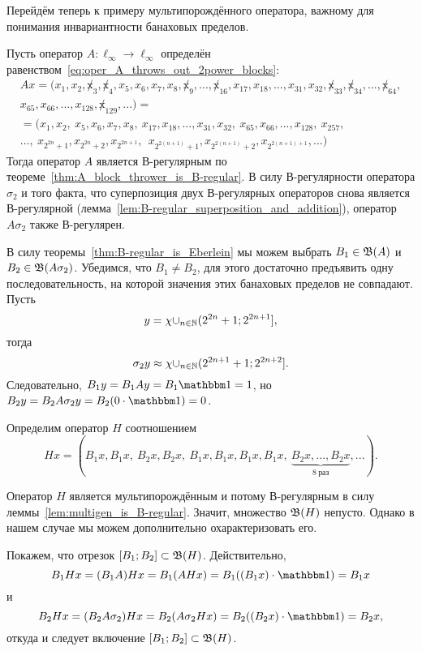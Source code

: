 Перейдём теперь к примеру мультипорождённого оператора, важному для понимания инвариантности банаховых пределов.

\begin{example}
	\label{ex:multigen_invariant_interval}
	Пусть оператор $A:\ell_\infty\to\ell_\infty$
	определён равенством~\eqref{eq:oper_A_throws_out_2power_blocks}:
	\begin{multline}
		Ax = (x_1, x_2, \not x_3, \not x_4, x_5, x_6, x_7, x_8, \not x_9, ..., \not x_{16}, x_{17}, x_{18}, ..., x_{31}, x_{32}, \not x_{33}, \not x_{34}, ..., \not x_{64},
		\\
		x_{65}, x_{66}, ..., x_{128}, \not x_{129}, ...)=
		\\=
		(x_1, x_2, \ x_5, x_6, x_7, x_8, \ x_{17}, x_{18}, ..., x_{31}, x_{32}, \ x_{65}, x_{66}, ..., x_{128}, \ x_{257},
		\\
		..., \ x_{2^{2n} +1}, x_{2^{2n} +2},  x_{2^{2n+1}}, \ \ x_{2^{2(n+1)} +1},  x_{2^{2(n+1)} +2},  x_{2^{2(n+1)+1}}, ...)
	\end{multline}
	Тогда оператор $A$ является В-регулярным по теореме~\ref{thm:A_block_thrower_is_B-regular}.
	В силу В-регулярности оператора $\sigma_2$ и того факта,
	что суперпозиция двух В-регулярных операторов снова является В-регулярной (лемма~\ref{lem:B-regular_superposition_and_addition}),
	оператор $A\sigma_2$ также В-регулярен.

	В силу теоремы~\ref{thm:B-regular_is_Eberlein} мы можем выбрать $B_1 \in \mathfrak{B} (A)$ и $B_2 \in \mathfrak{B}(A\sigma_2)$.
	Убедимся, что $B_1 \ne B_2$, для этого достаточно предъявить одну последовательность, на которой
	значения этих банаховых пределов не совпадают.
	Пусть
	\begin{equation}
		y = \chi {\cup_{n\in\ensuremath{\mathbb{N}}}(2^{2n}+1; 2^{2n+1}]}
		,
	\end{equation}
	тогда
	\begin{equation}
		\sigma_2 y \approx \chi {\cup_{n\in\ensuremath{\mathbb{N}}}(2^{2n+1}+1; 2^{2n+2}]}
		.
	\end{equation}
	Следовательно, $B_1y = B_1Ay = B_1\one = 1$, но $B_2y = B_2A\sigma_2 y = B_2(0\cdot \one) = 0$.

	Определим оператор $H$ соотношением
	\begin{equation}
		Hx = (B_1 x, B_1 x, \ B_2 x, B_2 x, \ B_1 x, B_1 x, B_1 x, B_1 x, \ \underbrace{B_2 x, ..., B_2 x}_{8~\mbox{раз}}, ...)
		.
	\end{equation}

	Оператор $H$ является мультипорождённым и потому В-регулярным в силу леммы~\ref{lem:multigen_is_B-regular}.
	Значит, множество $\mathfrak{B}(H)$ непусто.
	Однако в нашем случае мы можем дополнительно охарактеризовать его.

	Покажем, что отрезок $[B_1; B_2]\subset \mathfrak{B}(H)$.
	Действительно,
	\begin{equation}
		B_1 Hx  = (B_1 A) Hx = B_1 (AHx)  = B_1 ((B_1 x) \cdot \one) = B_1 x
	\end{equation}
	и
	\begin{equation}
		B_2 Hx  = (B_2 A\sigma_2) Hx = B_2 (A\sigma_2 Hx)  = B_2 ((B_2 x) \cdot \one) = B_2 x
		,
	\end{equation}
	откуда и следует включение $[B_1; B_2]\subset \mathfrak{B}(H)$.
\end{example}

